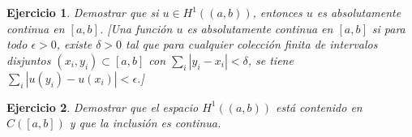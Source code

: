 \documentclass[11pt]{report}
\newtheorem{ex}{Ejercicio}
\newenvironment{solution}{\begin{proof}[Solución]}{\end{proof}}
\newcommand{\Ldos}{L^2}
\newcommand{\Huno}{H^1}
\begin{document}
\begin{ex}
Demostrar que si $u \in \Huno((a, b))$, entonces $u$ es absolutamente continua en $[a, b]$. \emph{[Una función $u$ es absolutamente continua en $[a, b]$ si para todo $\epsilon > 0$, existe $\delta > 0$ tal que para cualquier colección finita de intervalos disjuntos $(x_i, y_i) \subset [a, b]$ con $\sum_i |y_i - x_i| < \delta$, se tiene $\sum_i |u(y_i) - u(x_i)| < \epsilon$.]}
\end{ex}

%
%


\begin{ex}
Demostrar que el espacio $\Huno((a, b))$ está contenido en $C([a, b])$ y que la inclusión es continua.
\end{ex}


\end{document}
